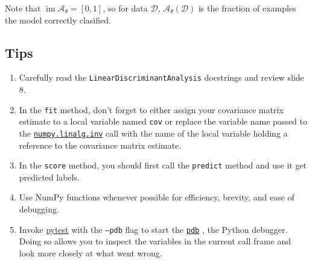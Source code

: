 \documentclass{article}
\numberwithin{equation}{section}
\newcommand{\pytest}{\href{https://docs.pytest.org/en/stable/}{pytest}}
\newcommand{\npinv}{%
    \href{%
        https://numpy.org/doc/stable/reference/generated/numpy.linalg.inv.html%
    }{\texttt{numpy.linalg.inv}}%
}
\newcommand{\pdb}{%
    \href{https://docs.python.org/3/library/pdb.html}{\texttt{pdb}}%
}
\begin{document}
Note that $ \operatorname{im}\mathcal{A}_\theta = [0, 1] $, so for
data $ \mathcal{D} $, $ \mathcal{A}_\theta(\mathcal{D}) $ is the
fraction of examples the model correctly clasified.

\subsection{Tips}

\begin{enumerate}
    \item
    Carefully read the \texttt{LinearDiscriminantAnalysis} docstrings and
    review slide 8.

    \item
    In the \texttt{fit} method, don't forget to either assign your covariance
    matrix estimate to a local variable named \texttt{cov} or replace the
    variable name passed to the \npinv{} call with the name of the local
    variable holding a reference to the covariance matrix estimate.

    \item
    In the \texttt{score} method, you should first call the \texttt{predict}
    method and use it get predicted labels.    

    \item
    Use NumPy functions whenever possible for efficiency, brevity, and ease
    of debugging.

    \item
    Invoke \pytest{} with the \texttt{--pdb} flag to start the \pdb, the
    Python debugger. Doing so allows you to inspect the variables in the
    current call frame and look more closely at what went wrong.
\end{enumerate}
\end{document}
